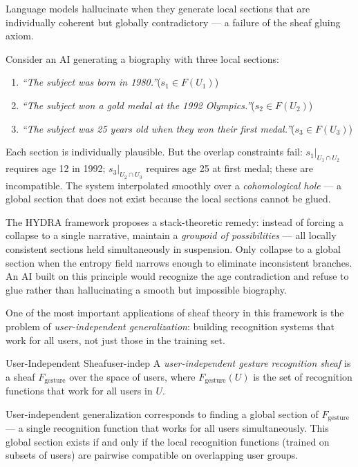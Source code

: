 \begin{example}[title={AI Hallucination as Cohomological Failure}]
  Language models hallucinate when they generate local sections that are
  individually coherent but globally contradictory — a failure of the
  sheaf gluing axiom.

  Consider an AI generating a biography with three local sections:
  \begin{enumerate}
    \item \emph{``The subject was born in 1980.''}\quad ($s_1 \in F(U_1)$)
    \item \emph{``The subject won a gold medal at the 1992 Olympics.''}\quad ($s_2 \in F(U_2)$)
    \item \emph{``The subject was 25 years old when they won their first medal.''}\quad ($s_3 \in F(U_3)$)
  \end{enumerate}
  Each section is individually plausible. But the overlap constraints fail:
  $s_1|_{U_1 \cap U_2}$ requires age 12 in 1992; $s_3|_{U_2 \cap U_3}$
  requires age 25 at first medal; these are incompatible. The system
  interpolated smoothly over a \emph{cohomological hole} — a global
  section that does not exist because the local sections cannot be glued.

  The HYDRA framework proposes a stack-theoretic remedy: instead of
  forcing a collapse to a single narrative, maintain a \emph{groupoid of
  possibilities} — all locally consistent sections held simultaneously in
  suspension. Only collapse to a global section when the entropy field
  narrows enough to eliminate inconsistent branches. An AI built on this
  principle would recognize the age contradiction and refuse to glue rather
  than hallucinating a smooth but impossible biography.
\end{example}


One of the most important applications of sheaf theory in this framework
is the problem of \emph{user-independent generalization}: building
recognition systems that work for all users, not just those in the
training set.

\begin{definition}{User-Independent Sheaf}{user-indep}
  A \emph{user-independent gesture recognition sheaf} is a sheaf
  $F_\text{gesture}$ over the space of users, where $F_\text{gesture}(U)$
  is the set of recognition functions that work for all users in $U$.
\end{definition}

User-independent generalization corresponds to finding a global section
of $F_\text{gesture}$ — a single recognition function that works for
all users simultaneously. This global section exists if and only if
the local recognition functions (trained on subsets of users) are
pairwise compatible on overlapping user groups.

